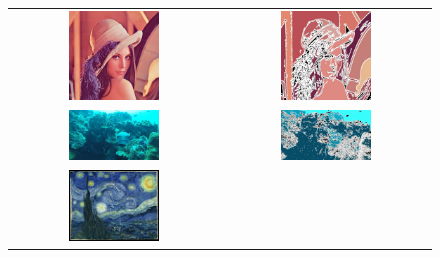 \begin{figure}[h]
    \begin{center}
    \begin{tabular}{ c c }
        \includegraphics[width=0.45\textwidth]{Figures/lena.jpg} &
        \includegraphics[width=0.45\textwidth]{Figures/lenaDA.jpg} \\
        \includegraphics[width=0.45\textwidth]{Figures/pufferfish6.jpg} &
        \includegraphics[width=0.45\textwidth]{Figures/pufferfishDA.jpg} \\
        \includegraphics[width=0.45\textwidth]{Figures/starry_night.jpg} &

\end{tabular}
\end{center}
\end{figure}
